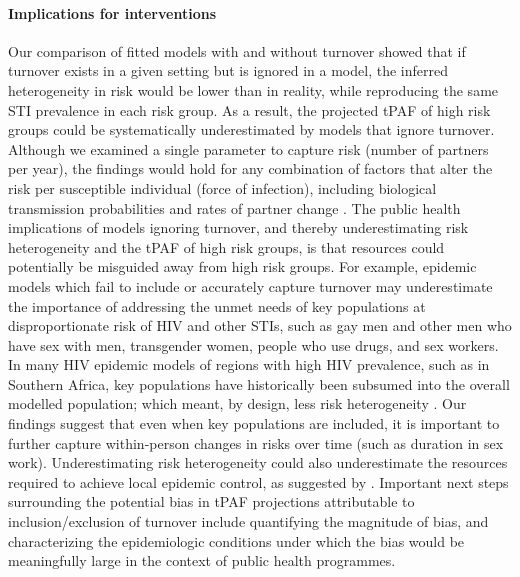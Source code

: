 \paragraph{Implications for interventions}
Our comparison of fitted models with and without turnover showed that
if turnover exists in a given setting but is ignored in a model,
the inferred heterogeneity in risk would be lower than in reality,
while reproducing the same STI prevalence in each risk group.
As a result, the projected tPAF of high risk groups
could be systematically underestimated by models that ignore turnover.
Although we examined a single parameter to capture risk
(number of partners per year),
the findings would hold for any combination of factors
that alter the risk per susceptible individual (force of infection), including
biological transmission probabilities and rates of partner change \citep{Anderson1991}.
The public health implications of models ignoring turnover,
and thereby underestimating risk heterogeneity and the tPAF of high risk groups,
is that resources could potentially be misguided away from high risk groups.
For example, epidemic models which fail to include or accurately capture
turnover may underestimate the importance of addressing the unmet
needs of key populations at disproportionate risk of HIV and other STIs, such as
gay men and other men who have sex with men, transgender women, people who use drugs, and sex workers.
In many HIV epidemic models of regions with high HIV prevalence, such as in Southern Africa,
key populations have historically been subsumed into the overall modelled population;
which meant, by design, less risk heterogeneity \citep{Eaton2012,Cori2014,Mishra2016}.
Our findings suggest that even when key populations are included, it is important to
further capture within-person changes in risks over time (such as duration in sex work).
Underestimating risk heterogeneity could also underestimate the resources
required to achieve local epidemic control, as suggested by \citet{Henry2015,Hontelez2013}.
Important next steps surrounding the potential bias in tPAF projections
attributable to inclusion/exclusion of turnover include
quantifying the magnitude of bias,
and characterizing the epidemiologic conditions under which the bias
would be meaningfully large in the context of public health programmes.
